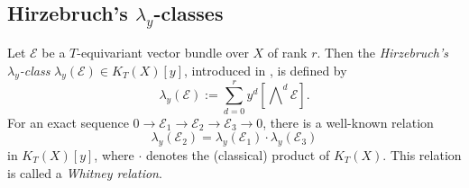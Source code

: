 \documentclass[a4paper, 11pt, reqno]{amsart}
\numberwithin{equation}{section}
\newcommand{\CE}{\mathcal{E}}
\newcommand{\class}[1]{\left[ #1 \right]}
\newcommand{\extprod}{\bigwedge\nolimits}
\theoremstyle{plain}
\theoremstyle{definition}
\theoremstyle{remark}
\begin{document}
\subsection{\texorpdfstring{Hirzebruch's $\lambda_{y}$-classes}{Hirzebruch's lambda-classes}}
Let $\CE$ be a $T$-equivariant vector bundle over $X$ of rank $r$. 
Then the \emph{Hirzebruch's $\lambda_{y}$-class} $\lambda_{y}(\CE) \in K_{T}(X)[y]$, introduced in \cite{Hirzebruch}, is defined by 
\begin{equation}
\lambda_{y}(\CE) := \sum_{d=0}^{r} y^{d} \class{\extprod^{d} \CE}. 
\end{equation}
For an exact sequence $0 \rightarrow \CE_{1} \rightarrow \CE_{2} \rightarrow \CE_{3} \rightarrow 0$, there is a well-known relation 
\begin{equation}
\lambda_{y}(\CE_{2}) = \lambda_{y}(\CE_{1}) \cdot \lambda_{y}(\CE_{3})
\end{equation} 
in $K_{T}(X)[y]$, where $\cdot$ denotes the (classical) product of $K_{T}(X)$. This relation is called a \emph{Whitney relation}. 
\end{document}
